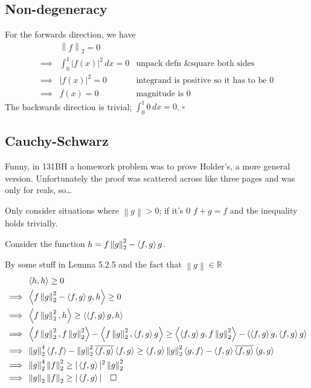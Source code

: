 \documentclass[12pt]{article}
\newcommand{\R}{\mathbb{R}}
\newcommand{\norm}[1]{\left\lVert#1\right\rVert}
\begin{document}
\subsection{Non-degeneracy}

For the forwards direction, we have
\begin{align*}
             & \norm{f}_2 = 0                                                                   \\
  \implies{} & \int_{0}^{1} |f(x)|^2\,dx = 0 & \text{unpack defn \& square both sides}          \\
  \implies{} & |f(x)|^2 = 0                  & \text{integrand is positive so it has to be $0$} \\
  \implies{} & f(x)=0                        & \text{magnitude is $0$}
\end{align*}
The backwards direction is trivial; $\int_{0}^{1} 0\,dx = 0$. $\square$

\subsection{Cauchy-Schwarz}\label{sec:p4p2}

Funny, in 131BH a homework problem was to prove Holder's, a more general version.
Unfortunately the proof was scattered across like three pages and was only for reals, so\dots

Only consider situations where $\norm{g} > 0$;
if it's $0$ $f+g=f$ and the inequality holds trivially.

Consider the function $h=f\norm{g}_2^2 - \braket{f, g}g$.

By some stuff in Lemma 5.2.5 and the fact that $\norm{g} \in \R$
\begin{align*}
             & \Braket{h, h} \ge 0                                                                \\
  \implies{} & \Braket{f\norm{g}_2^2 - \braket{f, g}g, h} \ge 0                                   \\
  \implies{} & \Braket{f\norm{g}_2^2, h} \ge \Braket{\braket{f, g}g, h}                           \\
  \implies{} & \Braket{f\norm{g}_2^2, f\norm{g}_2^2} - \Braket{f\norm{g}_2^2, \braket{f, g}g}
  \ge \Braket{\braket{f, g}g, f\norm{g}_2^2} - \Braket{\braket{f, g}g, \braket{f, g}g}            \\
  \implies{} & \norm{g}_2^4 \Braket{f, f} - \norm{g}_2^2\overline{\braket{f, g}}\braket{f, g}
  \ge \braket{f, g}\norm{g}_2^2\Braket{g, f} - \braket{f, g}\overline{\braket{f, g}}\Braket{g, g} \\
  \implies{} & \norm{g}_2^4\norm{f}_2^2 \ge |\braket{f, g}|^2\norm{g}_2^2                         \\
  \implies{} & \norm{g}_2\norm{f}_2 \ge |\braket{f, g}|\quad\square
\end{align*}
\end{document}
